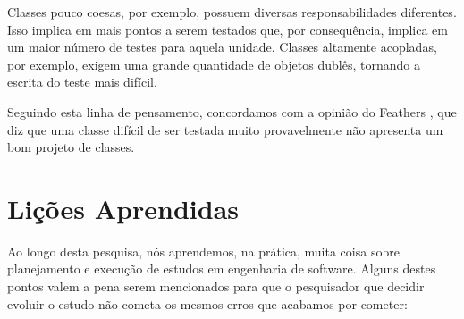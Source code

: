 Classes pouco coesas, por exemplo, possuem diversas responsabilidades diferentes.
Isso implica em mais pontos a serem testados que, por consequência, implica
em um maior número de testes para aquela unidade. Classes altamente acopladas,
por exemplo, exigem uma grande quantidade de objetos dublês, tornando a escrita
do teste mais difícil.

Seguindo esta linha de pensamento, concordamos com a opinião do Feathers \cite{feathers-synergy}, 
que diz que uma classe difícil de ser testada muito provavelmente
não apresenta um bom projeto de classes.

\section{Lições Aprendidas}

Ao longo desta pesquisa, nós aprendemos, na prática, muita coisa sobre planejamento
e execução de estudos em engenharia de software. Alguns destes pontos valem
a pena serem mencionados para que o pesquisador que decidir evoluir o estudo
não cometa os mesmos erros que acabamos por cometer:

